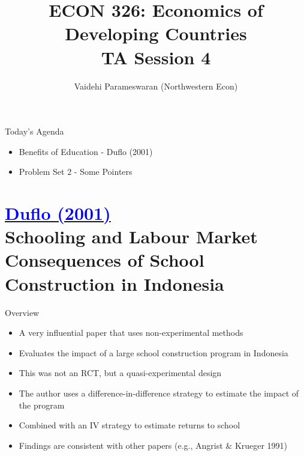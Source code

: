 \documentclass[11pt,notes=hide,aspectratio=169,mathserif]{beamer}
\title[class]{ECON 326: Economics of Developing Countries \\ TA Session 4}
\author[vaidehi's class ]{Vaidehi Parameswaran (Northwestern Econ)}
\date{\monthname[\the\month] \the\year}
\begin{document}
\begin{frame}[plain]
\titlepage
\end{frame}


\begin{frame}{Today's Agenda}

\begin{itemize}
\item Benefits of Education - Duflo (2001)
\item Problem Set 2 - Some Pointers 
\end{itemize}
\end{frame}



\section*{\href{https://www.aeaweb.org/articles?id=10.1257/0002828041302109}{\textcolor{blue}{Duflo (2001)}} \\[5mm] 
\textnormal{\small{Schooling and Labour Market Consequences of School Construction in Indonesia}}}

\begin{frame}{Overview}
\begin{itemize}
\item A very influential paper that uses non-experimental methods 
 \item Evaluates the impact of a large school construction program in Indonesia
 \item This was not an RCT, but a quasi-experimental design
 \item The author uses a difference-in-difference strategy to estimate the impact of the program
 \item Combined with an IV strategy to estimate returns to school
 \item Findings are consistent with other papers (e.g., Angrist \& Krueger 1991)
\end{itemize}
\end{frame}
\end{document}
